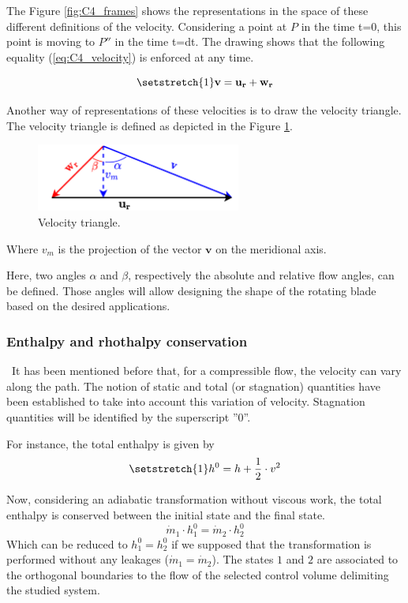 The Figure \ref{fig:C4_frames} shows the representations in the space of these different definitions of the velocity. Considering a point at $P$ in the time t=0, this point is moving to \(P''\) in the time t=dt.  
The drawing shows that the following equality (\ref{eq:C4_velocity}) is enforced at any time.

\begin{equation}
    \setstretch{1}
    \mathbf{v} = \mathbf{u_r} + \mathbf{w_r} \label{eq:C4_velocity}
\end{equation}

Another way of representations of these velocities is to draw the velocity triangle. The velocity triangle is defined as depicted in the Figure \ref{fig:C4_vtriang}.

\begin{figure}[h]
    \centering
    \includegraphics[width=0.6\textwidth]{Vtriangle.png}
    \caption{Velocity triangle.}
    \label{fig:C4_vtriang}
\end{figure}
Where $v_m$ is the projection of the vector $\mathbf{v}$ on the meridional axis.

Here, two angles $\alpha$ and $\beta$, respectively the absolute and relative flow angles, can be defined. Those angles will allow designing the shape of the rotating blade based on the desired applications. 

\subsubsection{Enthalpy and rhothalpy conservation}
\quad\ It has been mentioned before that, for a compressible flow, the velocity can vary along the path. The notion of static and total (or stagnation) quantities have been established to take into account this variation of velocity. Stagnation quantities will be identified by the superscript ''0''.

For instance, the total enthalpy is given by
\begin{equation}
    \setstretch{1}
    h^0 = h + \frac{1}{2}\cdot v^2\label{eq:C4_h0}
\end{equation}

Now, considering an adiabatic transformation without viscous work, the total enthalpy is conserved between the initial state and the final state.
\begin{equation}
    \dot{m}_1\cdot h_1^0 = \dot{m}_2\cdot  h_2^0 \label{eq:C4_hcons}
\end{equation}
Which can be reduced to \(h_1^0 = h_2^0\) if we supposed that the transformation is performed without any leakages (\(\dot{m}_1=\dot{m}_2\)). The states \(1\) and \(2\) are associated to the orthogonal boundaries to the flow of the selected control volume delimiting the studied system.

